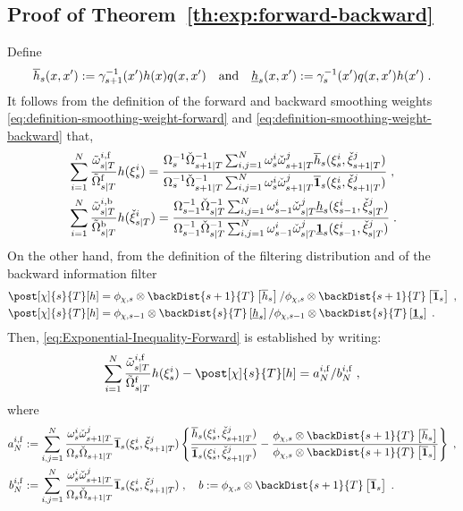 \subsection{Proof of Theorem~\ref{th:exp:forward-backward}}
\label{proof:th:exp:forward-backward}
Define
\[
\overline{h}_{s}(x,x'):= \gamma^{-1}_{s+1}(x') h(x) q(x,x')\quad\mbox{and}\quad\underline{h}_{s}(x,x'):= \gamma_s^{-1}(x') q(x,x') h(x')\;.
\]
It follows from the definition of the forward and backward smoothing weights \eqref{eq:definition-smoothing-weight-forward} and \eqref{eq:definition-smoothing-weight-backward} that,
\begin{align}
\label{eq:forward-approximation}
& \sum_{i=1}^N \frac{\smwght{s}{T}{i, \mathrm{f}}}{\tilde{\Omega}^{\mathrm{f}}_{s|T}} h(\epart{s}{i}) =
\frac{\sumwght{s}^{-1} \backsumwght{s+1}{T}^{-1} \sum_{i,j=1}^N \ewght{s}{i} \ebackwght{s+1}{T}{j} \fup{h}{s}(\epart{s}{i},\ebackpart{s+1}{T}{j}) }
{\sumwght{s}^{-1} \backsumwght{s+1}{T}^{-1} \sum_{i,j=1}^N \ewght{s}{i} \ebackwght{s+1}{T}{j}  \fup{\1}{s}(\epart{s}{i},\ebackpart{s+1}{T}{j}) } \eqsp, \\
\label{eq:backward-approximation}
& \sum_{i=1}^N \frac{\smwght{s}{T}{i, \mathrm{b}}}{\tilde{\Omega}^{\mathrm{b}}_{s|T}} h(\ebackpart{s}{T}{i})= \frac{\sumwght{s-1}^{-1} \backsumwght{s}{T}^{-1} \sum_{i,j=1}^N \ewght{s-1}{i} \ebackwght{s}{T}{j} \fdown{h}{s}(\epart{s-1}{i},\ebackpart{s}{T}{j})}{\sumwght{s-1}^{-1} \backsumwght{s}{T}^{-1} \sum_{i,j=1}^N \ewght{s-1}{i} \ebackwght{s}{T}{j}\fdown{\1}{s}(\epart{s-1}{i},\ebackpart{s}{T}{j})} \eqsp.
 \end{align}
 On the other hand, from the definition of the filtering distribution and of the backward information filter
\begin{align*}
& \post[\Xinit]{s}{T}[h] = \filt{\Xinit,s}\otimes\backDist{s+1}{T}\left[\fup{h}{s}\right]/\filt{\Xinit,s}\otimes\backDist{s+1}{T}\left[\fup{\1}{s}\right] \eqsp, \\
& \post[\Xinit]{s}{T}[h] = \filt{\Xinit,s-1}\otimes\backDist{s}{T}\left[\fdown{h}{s}\right]/\filt{\Xinit,s-1}\otimes\backDist{s}{T}\left[\fdown{\1}{s}\right]\eqsp.
\end{align*}
Then, \eqref{eq:Exponential-Inequality-Forward} is established by writing:
\[
\sum_{i=1}^N \frac{\smwght{s}{T}{i, \mathrm{f}}}{\tilde{\Omega}^{\mathrm{f}}_{s|T}} h(\epart{s}{i}) - \post[\Xinit]{s}{T} [h] = a_N^{i, \mathrm{f}}/b_N^{i, \mathrm{f}}\eqsp,
\]
where
\begin{align*}
a_N^{i, \mathrm{f}}&\eqdef \sum_{i,j=1}^N \frac{\ewght{s}{i} \ebackwght{s+1}{T}{j}}{\sumwght{s}\backsumwght{s+1}{T}}\fup{\1}{s}(\epart{s}{i},\ebackpart{s+1}{T}{j})\left\{\frac{\fup{h}{s}(\epart{s}{i},\ebackpart{s+1}{T}{j})}{\fup{\1}{s}(\epart{s}{i},\ebackpart{s+1}{T}{j})}-\frac{\filt{\Xinit,s}\otimes\backDist{s+1}{T}\left[\fup{h}{s}\right]}{\filt{\Xinit,s}\otimes\backDist{s+1}{T}\left[\fup{\1}{s}\right]}\right\}\eqsp,\\
b_N^{i, \mathrm{f}} & \eqdef \sum_{i,j=1}^N \frac{\ewght{s}{i} \ebackwght{s+1}{T}{j}}{\sumwght{s}\backsumwght{s+1}{T}}  \fup{\1}{s}(\epart{s}{i},\ebackpart{s+1}{T}{j})\eqsp,\quad b\eqdef \filt{\Xinit,s}\otimes\backDist{s+1}{T}\left[\fup{\1}{s}\right]\eqsp.
\end{align*}
